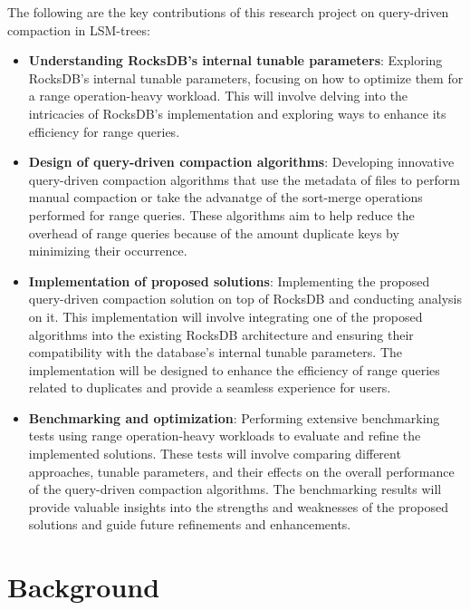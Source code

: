 \documentclass[balance=false, sigconf]{acmart}
\begin{document}
The following are the key contributions of this research project on 
query-driven compaction in LSM-trees:
\begin{itemize}
    \item \textbf{Understanding RocksDB's internal tunable parameters}: Exploring 
    RocksDB's internal tunable parameters, focusing on how to optimize them for a 
    range operation-heavy workload. This will involve delving into the intricacies 
    of RocksDB's implementation and exploring ways to enhance its efficiency for range queries.
    \item \textbf{Design of query-driven compaction algorithms}: Developing innovative 
    query-driven compaction algorithms that use the metadata of files to perform manual compaction or take the advanatge of the sort-merge operations
     performed for range queries. These algorithms aim to help reduce the overhead of 
     range queries because of the amount duplicate keys by minimizing their occurrence.
    \item \textbf{Implementation of proposed solutions}: Implementing the proposed query-driven 
    compaction solution on top of RocksDB and conducting analysis on it. This 
    implementation will involve integrating one of the proposed algorithms into the existing 
    RocksDB architecture and ensuring their compatibility with the database's internal 
    tunable parameters. The implementation will be designed to enhance the efficiency of 
    range queries related to duplicates and provide a seamless experience for users.
    \item \textbf{Benchmarking and optimization}: Performing extensive benchmarking tests 
    using range operation-heavy workloads to evaluate and refine the implemented solutions. 
    These tests will involve comparing different approaches, tunable parameters, and their 
    effects on the overall performance of the query-driven compaction algorithms. The 
    benchmarking results will provide valuable insights into the strengths and weaknesses 
    of the proposed solutions and guide future refinements and enhancements.
\end{itemize}

\section{Background}
\end{document}
